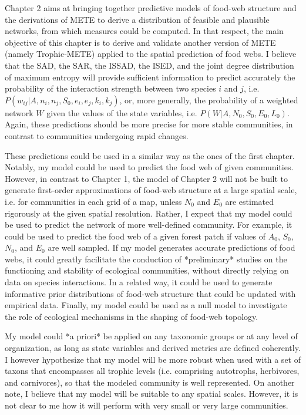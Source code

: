 Chapter 2 aims at bringing together predictive models of food-web structure and
the derivations of METE to derive a distribution of feasible and plausible
networks, from which measures could be computed. In that respect, the main
objective of this chapter is to derive and validate another version of METE
(namely Trophic-METE) applied to the spatial prediction of food webs. I believe
that the SAD, the SAR, the ISSAD, the ISED, and the joint degree distribution of
maximum entropy will provide sufficient information to predict accurately the
probability of the interaction strength between two species $i$ and $j$, i.e.
$P(w_{ij}|A, n_i, n_j, S_0, e_i, e_j, k_i, k_j)$, or, more generally, the
probability of a weighted network $W$ given the values of the state variables,
i.e. $P(W|A, N_0, S_0, E_0, L_0)$. Again, these predictions should be more
precise for more stable communities, in contrast to communities undergoing rapid
changes.  

These predictions could be used in a similar way as the ones of the first
chapter. Notably, my model could be used to predict the food web of given
communities. However, in contrast to Chapter 1, the model of Chapter 2 will not
be built to generate first-order approximations of food-web structure at a large
spatial scale, i.e. for communities in each grid of a map, unless $N_0$ and
$E_0$ are estimated rigorously at the given spatial resolution. Rather, I expect
that my model could be used to predict the network of more well-defined
community. For example, it could be used to predict the food web of a given
forest patch if values of $A_0$, $S_0$, $N_0$, and $E_0$ are well sampled. If my
model generates accurate predictions of food webs, it could greatly facilitate
the conduction of *preliminary* studies on the functioning and stability of
ecological communities, without directly relying on data on species
interactions. In a related way, it could be used to generate informative prior
distributions of food-web structure that could be updated with empirical data.
Finally, my model could be used as a null model to investigate the role of
ecological mechanisms in the shaping of food-web topology.

My model could *a priori* be applied on any taxonomic groups or at any level of
organization, as long as state variables and derived metrics are defined
coherently. I however hypothesize that my model will be more robust when used
with a set of taxons that encompasses all trophic levels (i.e. comprising
autotrophs, herbivores, and carnivores), so that the modeled community is well
represented. On another note, I believe that my model will be suitable to any
spatial scales. However, it is not clear to me how it will perform with very
small or very large communities.

